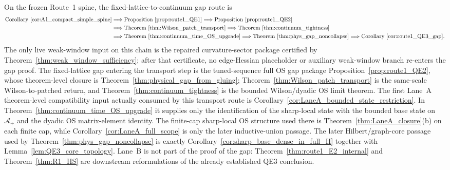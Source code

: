 \begin{remark}\label{rem:QE3_dependency_map}\label{rem:route1_packet38_transport_certification}
On the frozen Route~1 spine, the fixed-lattice-to-continuum gap route is
\[
\begin{aligned}
\text{Corollary~\ref{cor:A1_compact_simple_spine}}
&\Longrightarrow \text{Proposition~\ref{prop:route1_QE1}}
\Longrightarrow \text{Proposition~\ref{prop:route1_QE2}}\\
&\Longrightarrow \text{Theorem~\ref{thm:Wilson_patch_transport}}
\Longrightarrow \text{Theorem~\ref{thm:continuum_tightness}}\\
&\Longrightarrow \text{Theorem~\ref{thm:continuum_time_OS_upgrade}}
\Longrightarrow \text{Theorem~\ref{thm:phys_gap_noncollapse}}
\Longrightarrow \text{Corollary~\ref{cor:route1_QE3_gap}}.
\end{aligned}
\]
The only live weak-window input on this chain is the repaired curvature-sector package certified by Theorem~\ref{thm:weak_window_sufficiency}; after that certificate, no edge-Hessian placeholder or auxiliary weak-window branch re-enters the gap proof.
The fixed-lattice gap entering the transport step is the tuned-sequence full OS gap package Proposition~\ref{prop:route1_QE2}, whose theorem-level closure is Theorem~\ref{thm:physical_gap_from_gluing}; Theorem~\ref{thm:Wilson_patch_transport} is the same-scale Wilson-to-patched return, and Theorem~\ref{thm:continuum_tightness} is the bounded Wilson/dyadic OS limit theorem.
The first Lane~A theorem-level compatibility input actually consumed by this transport route is Corollary~\ref{cor:LaneA_bounded_state_restriction}. In Theorem~\ref{thm:continuum_time_OS_upgrade} it supplies only the identification of the sharp-local state with the bounded base state on $\mathcal A_+$ and the dyadic OS matrix-element identity. The finite-cap sharp-local OS structure used there is Theorem~\ref{thm:LaneA_closure}(b) on each finite cap, while Corollary~\ref{cor:LaneA_full_scope} is only the later inductive-union passage. The later Hilbert/graph-core passage used by Theorem~\ref{thm:phys_gap_noncollapse} is exactly Corollary~\ref{cor:sharp_base_dense_in_full_H} together with Lemma~\ref{lem:QE3_core_topology}.
Lane~B is not part of the proof of the gap: Theorem~\ref{thm:route1_E2_internal} and Theorem~\ref{thm:R1_HS} are downstream reformulations of the already established QE3 conclusion.
\end{remark}

